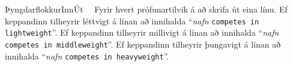 \begin{problem}{Þyngdarflokkur}{Inn}{Út}{~}{~}
	\Output
		Fyrir hvert prófunartilvik á að skrifa út eina línu. Ef keppandinn tilheyrir léttvigt á línan að innihalda "`\textit{nafn} \texttt{competes in lightweight}"'. Ef keppandinn tilheyrir millivigt á línan að innihalda "`\textit{nafn} \texttt{competes in middleweight}"'. Ef keppandinn tilheyrir þungavigt á línan að innihalda "`\textit{nafn} \texttt{competes in heavyweight}"'.

	\Examples

		\begin{example}
		\end{example}

\end{problem}